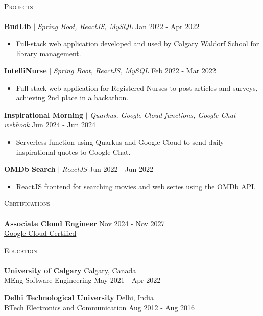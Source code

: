 \documentclass[a4paper]{article}
\newcommand{\lineunder} {
    \vspace*{-8pt} \\
    \hspace*{-18pt} \hrulefill \\
}
\newcommand{\header} [1] {
    \vspace*{5pt}
    {\hspace*{-18pt}\vspace*{6pt} \large\textsc{#1}}
    \vspace*{-6pt} \lineunder
}
\newcommand{\resumeHeadingProject}[3]{
    \vspace{1mm}
    {\textbf{#1}} $|$ \emph{#2} \hfill {#3}
    \vspace{-2mm}
}
\newcommand{\resumeItemProject}[1]{
  \item{
    \begin{justify}
    \setlength{\rightskip}{0.15in} {#1 \vspace{-4pt}}
    \end{justify}
  }
}
\newcommand{\resumeHeadingEducation}[4]{
    \textbf{#1} \hfill {#2}\\
    {#3} \hfill {#4}\\
    \vspace{2mm}
}
\begin{document}
\header{Projects}

\resumeHeadingProject {BudLib} {Spring Boot, ReactJS, MySQL} {Jan 2022 - Apr 2022}
\begin{itemize}
    \resumeItemProject {Full-stack web application developed and used by Calgary Waldorf School for library management.}
\end{itemize}

\resumeHeadingProject {IntelliNurse} {Spring Boot, ReactJS, MySQL} {Feb 2022 - Mar 2022}
\begin{itemize}
    \resumeItemProject {Full-stack web application for Registered Nurses to post articles and surveys, achieving 2nd place in a hackathon.}
\end{itemize}

\resumeHeadingProject {Inspirational Morning} {Quarkus, Google Cloud functions, Google Chat webhook} {Jun 2024 - Jun 2024}
\begin{itemize}
    \resumeItemProject {Serverless function using Quarkus and Google Cloud to send daily inspirational quotes to Google Chat.}
\end{itemize}

\resumeHeadingProject {OMDb Search} {ReactJS} {Jun 2022 - Jun 2022}
\begin{itemize}
    \resumeItemProject {ReactJS frontend for searching movies and web series using the OMDb API.}
\end{itemize}


\header{Certifications}
\href{https://www.credly.com/badges/52bb681c-f535-47e7-b669-78e9b4d7c4a0}{\textbf{Associate Cloud Engineer}} \hfill Nov 2024 - Nov 2027\\
\href{https://www.credly.com/badges/52bb681c-f535-47e7-b669-78e9b4d7c4a0}{Google Cloud Certified}
\vspace{2mm}


\header{Education}

\resumeHeadingEducation {University of Calgary} {Calgary, Canada} {MEng Software Engineering} {May 2021 - Apr 2022}
\resumeHeadingEducation {Delhi Technological University} {Delhi, India} {BTech Electronics and Communication} {Aug 2012 - Aug 2016}


\
\end{document}
